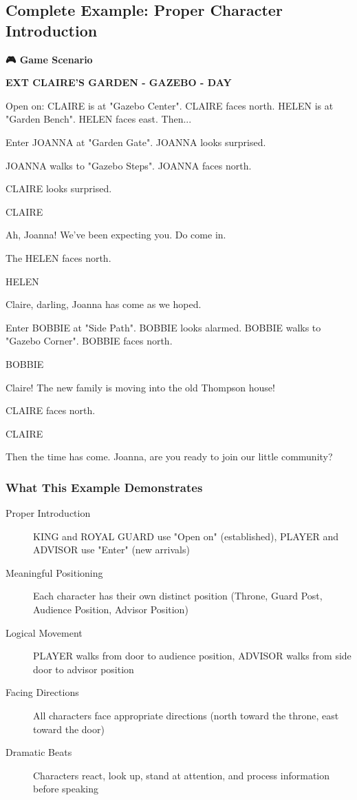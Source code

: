\documentclass[11pt,letterpaper,oldstylefigures]{memoir}
\newcommand{\slugline}[1]{\nobreak\textbf{\MakeUppercase{#1}}\par\nobreak\vspace{1\baselineskip}}
\newcommand{\speaker}[1]{\nobreak\hspace*{0.333\textwidth}\MakeUppercase{#1}\par\nobreak\vspace{0.5\baselineskip}}
\newcommand{\dialogue}[1]{\nobreak\hspace*{0.25\textwidth}\begin{minipage}{0.5\textwidth}#1\end{minipage}\par\vspace{1\baselineskip}}
\newcommand{\stagedir}[1]{#1\par\vspace{1\baselineskip}}
\newenvironment{FountainExample}
  {\begingroup
  \ttfamily\small
   \setlength{\parindent}{0pt}
  \setlength{\parskip}{0.5em}
  \allowdisplaybreaks
  \setlength{\displaywidowpenalty}{0}
  \setlength{\widowpenalty}{0}
  \setlength{\clubpenalty}{0}
  \setlength{\interlinepenalty}{0}
}
  {\endgroup}
\newenvironment{GameScenario}
{\begingroup
\small
\setlength{\parindent}{0pt}
\setlength{\parskip}{0.5em}
\allowdisplaybreaks
\setlength{\displaywidowpenalty}{0}
\setlength{\widowpenalty}{0}
\setlength{\clubpenalty}{0}
\setlength{\interlinepenalty}{0}
\begin{tcolorbox}[
    colback=orange!5,
    colframe=orange!75!black,
    boxrule=0.5pt,
    arc=2pt,
    left=0.5em,
    right=0.5em,
    top=0.25em,
    bottom=0.25em
]
\textbf{🎮 Game Scenario}
\end{tcolorbox}\par
}
{\endgroup}
\begin{document}
\subsection{Complete Example: Proper Character Introduction}

\begin{GameScenario}
\begin{FountainExample}
\slugline{EXT CLAIRE'S GARDEN - GAZEBO - DAY}

\stagedir{Open on: CLAIRE is at "Gazebo Center". CLAIRE faces north. HELEN is at "Garden Bench". HELEN faces east. Then...}
\stagedir{Enter JOANNA at "Garden Gate". JOANNA looks surprised.}
\stagedir{JOANNA walks to "Gazebo Steps". JOANNA faces north.}

\stagedir{CLAIRE looks surprised.}

\speaker{CLAIRE}
\dialogue{Ah, Joanna! We've been expecting you. Do come in.}

\stagedir{The HELEN faces north.}

\speaker{HELEN}
\dialogue{Claire, darling, Joanna has come as we hoped.}

\stagedir{Enter BOBBIE at "Side Path". BOBBIE looks alarmed. BOBBIE walks to "Gazebo Corner". BOBBIE faces north.}

\speaker{BOBBIE}
\dialogue{Claire! The new family is moving into the old Thompson house!}

\stagedir{CLAIRE faces north.}

\speaker{CLAIRE}
\dialogue{Then the time has come. Joanna, are you ready to join our little community?}
\end{FountainExample}
\end{GameScenario}

\subsubsection{What This Example Demonstrates}

\begin{description}
\item[Proper Introduction] KING and ROYAL GUARD use "Open on" (established), PLAYER and ADVISOR use "Enter" (new arrivals)
\item[Meaningful Positioning] Each character has their own distinct position (Throne, Guard Post, Audience Position, Advisor Position)
\item[Logical Movement] PLAYER walks from door to audience position, ADVISOR walks from side door to advisor position
\item[Facing Directions] All characters face appropriate directions (north toward the throne, east toward the door)
\item[Dramatic Beats] Characters react, look up, stand at attention, and process information before speaking
\end{description}
\end{document}
